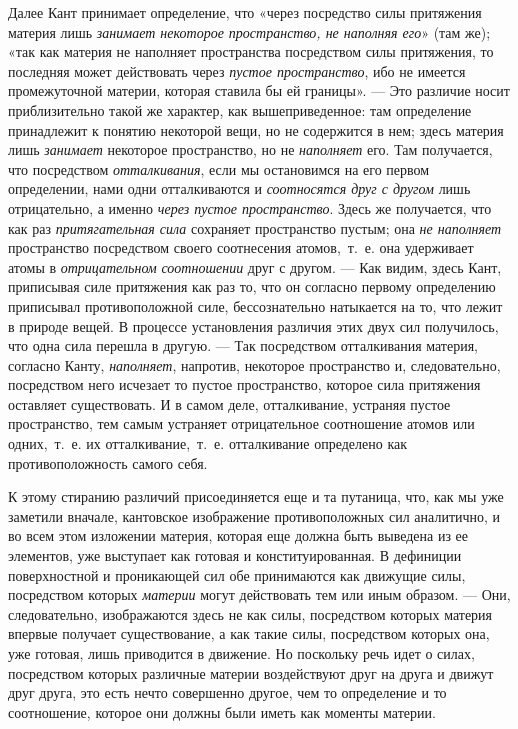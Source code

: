Далее Кант принимает определение, что «через посредство силы притяжения
материя лишь {\em занимает некоторое пространство, не
наполняя его}» (там же); «так как материя не наполняет пространства
посредством силы притяжения, то последняя может действовать через
{\em пустое пространство}, ибо не имеется промежуточной
материи, которая ставила бы ей границы». — Это различие носит
приблизительно такой же характер, как вышеприведенное: там определение
принадлежит к понятию некоторой вещи, но не содержится в нем; здесь материя
лишь {\em занимает} некоторое пространство, но не
{\em наполняет} его. Там получается, что посредством
{\em отталкивания}, если мы остановимся на его первом
определении, нами одни отталкиваются и {\em соотносятся
друг с другом} лишь отрицательно, а именно {\em через
пустое пространство}. Здесь же получается, что как раз
{\em притягательная сила} сохраняет пространство
пустым; она {\em не наполняет} пространство посредством
своего соотнесения атомов,~т.~е. она удерживает атомы в
{\em отрицательном}
{\em соотношении} друг с другом. — Как видим, здесь
Кант, приписывая силе притяжения как раз то, что он согласно первому
определению приписывал противоположной силе, бессознательно натыкается на
то, что лежит в природе вещей. В процессе установления различия этих двух
сил получилось, что одна сила перешла в другую. — Так посредством
отталкивания материя, согласно Канту, {\em наполняет},
напротив, некоторое пространство и, следовательно, посредством него
исчезает то пустое пространство, которое сила притяжения оставляет
существовать. И в самом деле, отталкивание, устраняя пустое пространство,
тем самым устраняет отрицательное соотношение атомов или одних,~т.~е. их
отталкивание,~т.~е. отталкивание определено как противоположность самого
себя.

К этому стиранию различий присоединяется еще и та путаница, что, как мы уже
заметили вначале, кантовское изображение противоположных сил аналитично, и
во всем этом изложении материя, которая еще должна быть выведена из ее
элементов, уже выступает как готовая и конституированная. В дефиниции
поверхностной и проникающей сил обе принимаются как движущие силы,
посредством которых {\em материи} могут действовать тем
или иным образом. — Они, следовательно, изображаются здесь не как силы,
посредством которых материя впервые получает существование, а как такие
силы, посредством которых она, уже готовая, лишь приводится в движение. Но
поскольку речь идет о силах, посредством которых различные материи
воздействуют друг на друга и движут друг друга, это есть нечто совершенно
другое, чем то определение и то соотношение, которое они должны были иметь
как моменты материи.

